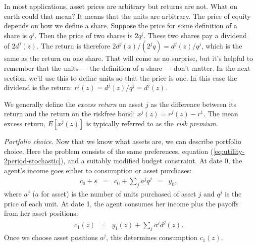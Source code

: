 In most applications, asset prices are arbitrary but returns are not.
What on earth could that mean?
It means that the units are arbitrary.
The price of equity depends on how we define a share.
Suppose the price for some definition of a share is $q^j$.
Then the price of two shares is $2q^j$.
These two shares pay a dividend of $2 d^j(z)$.
The return is therefore $ 2d^j(z)/(2^jq) = d^j(z)/q^j$,
which is the same as the return on one share.
That will come as no surprise, but it's helpful to remember
that the units --- the definition of a share --- don't matter.
In the next section, we'll use this to define
units so that the price is one.
In this case the dividend is the return:  $r^j(z) = d^j(z)/q^j = d^j(z)$.

We generally define the {\it excess return\/} on asset $j$ as the difference
between its return and the return on the riskfree bond:
$ x^j(z) = r^j(z) - r^1 $.
The mean excess return, $ E[x^j(z)]$ is typically referred
to as the {\it risk premium\/}.


{\it Portfolio choice.\/}
Now that we know what assets are, we can describe portfolio choice.
Here the problem consists of the same preferences,
equation (\ref{eq:utility-2period-stochastic}),
and a suitably modified budget constraint.
At date 0, the agent's income goes either to consumption
or asset purchases:
\begin{eqnarray}
    c_0 + s \;\;=\;\; c_0 + \sum_j a^j q^j &=& y_0 ,
    \label{eq:budget-2period-c0}
\end{eqnarray}
where $a^j$ ($a$ for asset) is the number of units
purchased of asset $j$ and $q^j$ is the price of each unit.
At date 1, the agent consumes her income
plus the payoffs from her asset positions:
\begin{eqnarray}
    c_1(z)  &=& y_1(z) + \sum_j a^j d^j(z) .
    \label{eq:budget-2period-c1}
\end{eqnarray}
Once we choose asset positions $a^j$,
this determines consumption $c_1(z)$.


